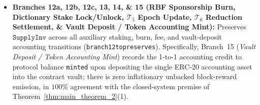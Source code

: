 \documentclass[runningheads,a4paper]{llncs}
\renewcommand{\_}{\textunderscore\allowbreak}
\begin{document}
\begin{itemize}
  \item \textbf{Branches 12a, 12b, 12c, 13, 14, \& 15 (RBF Sponsorship Burn, Dictionary Stake Lock/Unlock, $\mathcal{T}_5$ Epoch Update, $\mathcal{T}_6$ Reduction Settlement, \& Vault Deposit / Token Accounting Mint):} Preserves $\texttt{SupplyInv}$ across all auxiliary staking, burn, fee, and vault-deposit accounting transitions (\texttt{branch12\_to\_15\_preserves}). Specifically, Branch~15 (\emph{Vault Deposit / Token Accounting Mint}) records the 1-to-1 accounting credit to protocol balance \texttt{minted} upon depositing the single ERC-20 accounting asset into the contract vault; there is zero inflationary unbacked block-reward emission, in $100\%$ agreement with the closed-system premise of Theorem~\ref{thm:main_theorem_2}(1).
\end{itemize}
\end{document}
